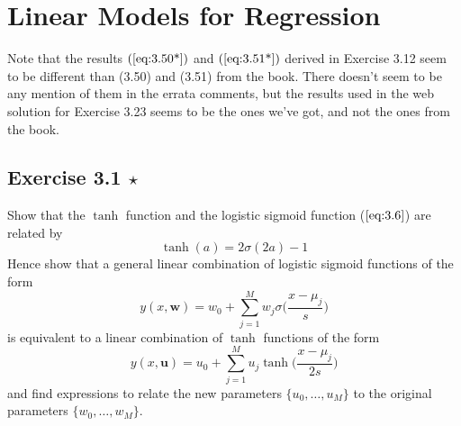 \chapter{Linear Models for Regression}

Note that the results $(\ref{eq:3.50*})$ and $(\ref{eq:3.51*})$ 
derived in Exercise 3.12 seem to be different than (3.50) and (3.51)
from the book. There doesn't seem to be any mention of them in the 
errata comments, but the results used in the web solution for 
Exercise 3.23 seems to be the ones we've got, and not the ones from the book.

\section*{Exercise 3.1 $\star$}
Show that the $\tanh$ function and the logistic
sigmoid function ($\ref{eq:3.6}$) are related by 
\begin{equation}\label{eq:3.100}\tag{3.100}
    \tanh(a) = 2\sigma(2a) - 1
\end{equation}
Hence show that a general linear combination of logistic sigmoid functions
of the form
\begin{equation}\label{eq:3.101}\tag{3.101}
    y(x, \mathbf{w}) = w_0 + \sum_{j=1}^{M} w_j \sigma\bigg(\frac{x-\mu_j}{s}\bigg)
\end{equation}
is equivalent to a linear combination of $\tanh$ functions of the form
\begin{equation}\label{eq:3.102}\tag{3.102}
    y(x, \mathbf{u}) = u_0 + \sum_{j=1}^{M} u_j \tanh\bigg(\frac{x-\mu_j}{2s}\bigg)
\end{equation}
and find expressions to relate the new parameters $\{u_0, \ldots, u_M\}$
to the original parameters $\{w_0, \ldots, w_M\}$.

\vspace{1em}

